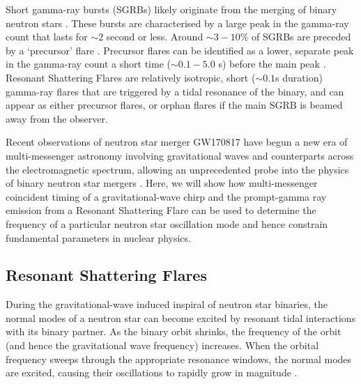 \documentclass[fleqn,usenatbib]{mnras}
\begin{document}
Short gamma-ray bursts (SGRBs) \citep{kouveliotou1993identification,d2015short} likely originate from the merging of binary neutron stars \citep{eichler1989nucleosynthesis,fong2009hubble}. These bursts are characterised by a large peak in the gamma-ray count that lasts for $\sim 2$ second or less. Around $\sim3-10$\% of SGRBs are preceded by a `precursor' flare \citep{zhong2019precursors,troja2010precursors}. 
Precursor flares can be identified as a lower, separate peak in the gamma-ray count a short time ($\sim 0.1-5.0$ s) before the main peak \citep{zhong2019precursors}. 
Resonant Shattering Flares \citep{tsang2012resonant} are relatively isotropic, short ($\sim 0.1$s duration) gamma-ray flares that are triggered by a tidal resonance of the binary, and can appear as either precursor flares, or orphan flares if the main SGRB is beamed away from the observer. 



Recent observations of neutron star merger GW170817 \citep{abbott2017gw170817,goldstein2017ordinary} have begun a new era of multi-messenger astronomy involving gravitational waves and counterparts across the electromagnetic spectrum, allowing an unprecedented probe into the physics of binary neutron star mergers \citep[see e.g. ][ and references therein]{raithel2019constraints}. Here, we will show how multi-messenger coincident timing of a gravitational-wave chirp and the prompt-gamma ray emission from a Resonant Shattering Flare can be used to determine the frequency of a particular neutron star oscillation mode and hence constrain fundamental parameters in nuclear physics.


\subsection{Resonant Shattering Flares}
\hspace{\parindent}During the gravitational-wave induced inspiral of neutron star binaries, the normal modes of a neutron star can become excited by resonant tidal interactions with its binary partner. As the binary orbit shrinks, the frequency of the orbit (and hence the gravitational wave frequency) increases. When the orbital frequency sweeps through the appropriate resonance windows, the normal modes are excited, causing their oscillations to rapidly grow in magnitude \citep{tsang2012resonant, tsang2013shattering, lai1994resonant}.
\end{document}
